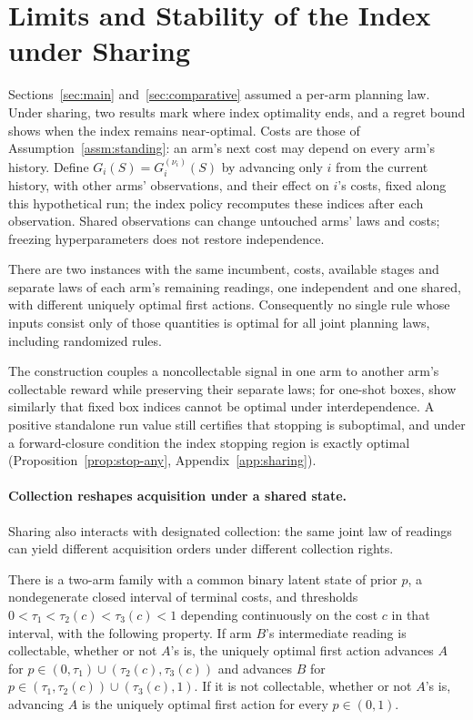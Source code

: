 \section{Limits and Stability of the Index under Sharing}
\label{sec:robust}

Sections~\ref{sec:main} and~\ref{sec:comparative} assumed a per-arm planning law. Under
sharing, two results mark where index optimality ends, and a regret bound shows when the index
remains near-optimal. Costs are those of Assumption~\ref{assm:standing}: an arm's next cost may
depend on every arm's history. Define $G_i(S)=G_i^{(\nu_i)}(S)$ by advancing only $i$ from the
current history, with other arms' observations, and their effect on $i$'s costs, fixed along
this hypothetical run; the index policy recomputes these indices after each observation. Shared observations can change untouched arms' laws and costs;
freezing hyperparameters does not restore independence.

\begin{proposition}\label{prop:no-local}
There are two instances with the same incumbent, costs, available stages and separate laws of
each arm's remaining readings, one independent and one shared, with different uniquely optimal
first actions. Consequently no single rule whose inputs consist only of those quantities is
optimal for all joint planning laws, including randomized rules.
\end{proposition}

The construction couples a noncollectable signal in one arm to another arm's collectable
reward while preserving their separate laws; for one-shot boxes,
\citet{bao2026interdependent} show similarly that fixed box indices cannot be optimal under
interdependence. A positive standalone run value still certifies that stopping is suboptimal,
and under a forward-closure condition the index stopping region is exactly optimal
(Proposition~\ref{prop:stop-any}, Appendix~\ref{app:sharing}).

\paragraph{Collection reshapes acquisition under a shared state.}
Sharing also interacts with designated collection: the same joint law of readings can
yield different acquisition orders under different collection rights.

\begin{proposition}\label{prop:switching}
There is a two-arm family with a common binary latent state of prior $p$, a nondegenerate
closed interval of terminal costs, and thresholds $0<\tau_1<\tau_2(c)<\tau_3(c)<1$ depending
continuously on the cost $c$ in that interval, with the following property. If arm $B$'s
intermediate reading is collectable, whether or not $A$'s is, the uniquely optimal first
action advances $A$ for $p\in(0,\tau_1)\cup(\tau_2(c),\tau_3(c))$ and advances $B$ for
$p\in(\tau_1,\tau_2(c))\cup(\tau_3(c),1)$. If it is not collectable, whether or not $A$'s is,
advancing $A$ is the uniquely optimal first action for every $p\in(0,1)$.
\end{proposition}

